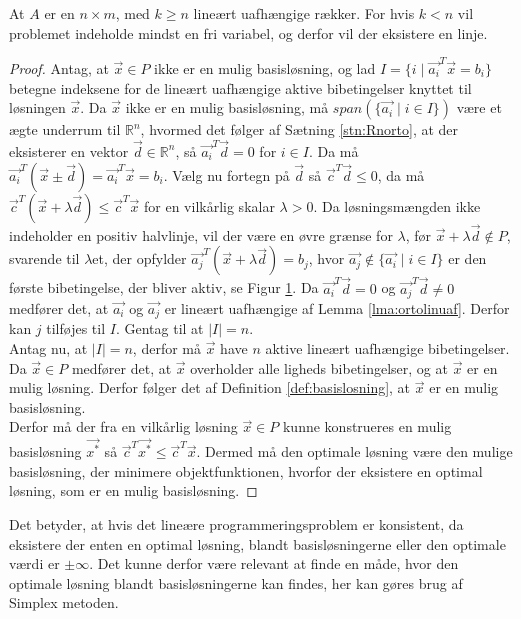 \begin{bem}
At $A$ er en $n \times m$, med $k\geq n$ lineært uafhængige rækker.
For hvis $k < n$ vil problemet indeholde mindst en fri variabel, og derfor vil der eksistere en linje.
\end{bem}

\begin{proof}
Antag, at $\vec{x} \in P$ ikke er en mulig basisløsning, og lad $I =\{i \mid \vec{a_i}^T\vec{x}=b_i\}$ betegne indeksene for de lineært uafhængige aktive bibetingelser knyttet til løsningen $\vec{x}$.
Da $\vec{x}$ ikke er en mulig basisløsning, må $span(\{\vec{a_i}\mid i\in I\})$ være et ægte underrum til $\mathds{R}^n$, hvormed det følger af Sætning \ref{stn:Rnorto}, at der eksisterer en vektor $\vec{d} \in \mathds{R}^n$, så $\vec{a_i}^T\vec{d}=0$ for $i \in I$.
Da må $\vec{a_i}^T(\vec{x}\pm \vec{d})= \vec{a_i}^T\vec{x}=b_i$.
Vælg nu fortegn på $\vec{d}$ så $\vec{c}^T\vec{d}\leq 0$, da må $\vec{c}^T(\vec{x}+\lambda\vec{d}) \leq \vec{c}^T\vec{x}$ for en vilkårlig skalar $\lambda > 0$.
Da løsningsmængden ikke indeholder en positiv halvlinje, vil der være en øvre grænse for $\lambda$, før $\vec{x}+\lambda\vec{d} \notin P$, svarende til $\lambda$et, der opfylder $\vec{a_j}^T(\vec{x}+\lambda\vec{d})=b_j$, hvor $\vec{a_j} \notin \{\vec{a_i}\mid i\in I\}$ er den første bibetingelse, der bliver aktiv, se Figur \ref{fig:eksistens}.
Da $\vec{a_i}^T\vec{d}=0$ og $\vec{a_j}^T\vec{d} \neq 0$ medfører det, at $\vec{a_i}$ og $\vec{a_j}$  er lineært uafhængige af Lemma \ref{lma:ortolinuaf}. 
Derfor kan $j$ tilføjes til $I$.
Gentag til at $|I|=n$.
\\ Antag nu, at $|I|=n$, derfor må $\vec{x}$ have $n$ aktive lineært uafhængige bibetingelser.
Da $\vec{x}\in P$ medfører det, at $\vec{x}$ overholder alle ligheds bibetingelser, og at $\vec{x}$ er en mulig løsning. 
Derfor følger det af Definition \ref{def:basislosning}, at $\vec{x}$ er en mulig basisløsning.
\\Derfor må der fra en vilkårlig løsning $\vec{x}\in P$ kunne konstrueres en mulig basisløsning $\vec{x^*}$ så $\vec{c}^T\vec{x^*} \leq \vec{c}^T \vec{x}$.
Dermed må den optimale løsning være den mulige basisløsning, der minimere objektfunktionen, hvorfor der eksistere en optimal løsning, som er en mulig basisløsning.
\end{proof}
\begin{figure}
\begin{center}
	
	\label{fig:eksistens}
\end{center}
\end{figure}
Det betyder, at hvis det lineære programmeringsproblem er konsistent, da eksistere der enten en optimal løsning, blandt basisløsningerne eller den optimale værdi er $\pm \infty$.
Det kunne derfor være relevant at finde en måde, hvor den optimale løsning blandt basisløsningerne kan findes, her kan gøres brug af Simplex metoden.




